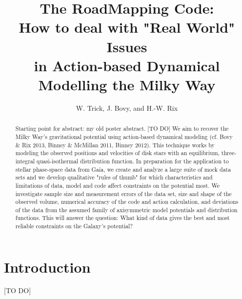 \documentclass[12pt,preprint]{aastex}
\begin{document}
\title{The {\sc RoadMapping} Code:\\How to deal with "Real World" Issues\\in Action-based Dynamical Modelling the Milky Way\\}

\author{W. Trick,  J. Bovy, and H.-W. Rix}




\begin{abstract}
Starting point for abstract: my old poster abstract. [TO DO] We aim to recover the Milky Way's gravitational potential using action-based dynamical modeling (cf. Bovy \& Rix 2013, Binney \& McMillan 2011, Binney 2012). This technique works by modeling the observed positions and velocities of disk stars with an equilibrium, three-integral quasi-isothermal distribution function. In preparation for the application to stellar phase-space data from Gaia, we create and analyze a large suite of mock data sets and we develop qualitative "rules of thumb" for which characteristics and limitations of data, model and code affect constraints on the potential most. We investigate sample size and measurement errors of the data set, size and shape of the observed volume, numerical accuracy of the code and action calculation, and deviations of the data from the assumed family of axisymmetric model potentials and distribution functions. This will answer the question: What kind of data gives the best and most reliable constraints on the Galaxy's potential?
\end{abstract}


\tableofcontents

\section{Introduction}

[TO DO]
\end{document}
